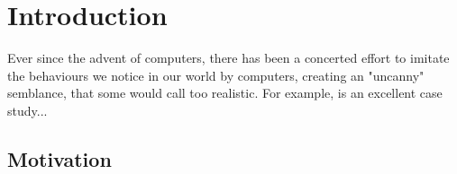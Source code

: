\documentclass[../main.tex]{subfiles}
\begin{document}
\section{Introduction}
Ever since the advent of computers, there has been a concerted effort to imitate the behaviours we notice in our world by computers, creating an "uncanny" semblance, that some would call too realistic.
For example, \cite{reynoldsFlocksHerdsSchools1987} is an excellent case study... 
\subsection{Motivation}
\end{document}
